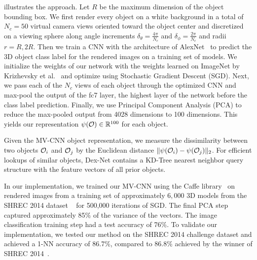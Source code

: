  illustrates the approach.
Let $R$ be the maximum dimension of the object bounding box.
We first render every object on a white background in a total of $N_c = 50$ virtual camera views oriented toward the object center and discretized on a viewing sphere along angle increments $\delta_{\theta} = \frac{4 \pi}{N_c}$ and $\delta_{\phi} = \frac{2 \pi}{N_c}$ and radii $r = R, 2R$.
Then we train a CNN with the architecture of AlexNet~\cite{krizhevsky2012imagenet} to predict the 3D object class label for the rendered images on a training set of models. 
We initialize the weights of our network with the weights learned on ImageNet by Krizhevsky et al.~\cite{krizhevsky2012imagenet} and optimize using Stochastic Gradient Descent (SGD). 
Next, we pass each of the $N_c$ views of each object through the optimized CNN and max-pool the output of the fc7 layer, the highest layer of the network before the class label prediction. 
Finally, we use Principal Component Analysis (PCA) to reduce the max-pooled output from 4028 dimensions to 100 dimensions.
This yields our representation $\psi(\mathcal{O}) \in \mathbb{R}^{100}$ for each object.

Given the MV-CNN object representation, we measure the dissimilarity between two objects $\mathcal{O}_i$ and $\mathcal{O}_j$ by the Euclidean distance $\| \psi(\mathcal{O}_i) - \psi(\mathcal{O}_j) \|_2$.
For efficient lookups of similar objects, Dex-Net contains a KD-Tree nearest neighbor query structure with the feature vectors of all prior objects.

In our implementation, we trained our MV-CNN using the Caffe library~\cite{jia2014caffe} on rendered images from a training set of approximately $6,000$ 3D models from the SHREC 2014 dataset ~\cite{li2015comparison} for 500,000 iterations of SGD.
The final PCA step captured approximately 85\% of the variance of the vectors.
The image classification training step had a test accuracy of 76\%.
To validate our implementation, we tested our method on the SHREC 2014 challenge dataset and achieved a 1-NN accuracy of 86.7\%, compared to 86.8\% achieved by the winner of SHREC 2014~\cite{li2015comparison}.

